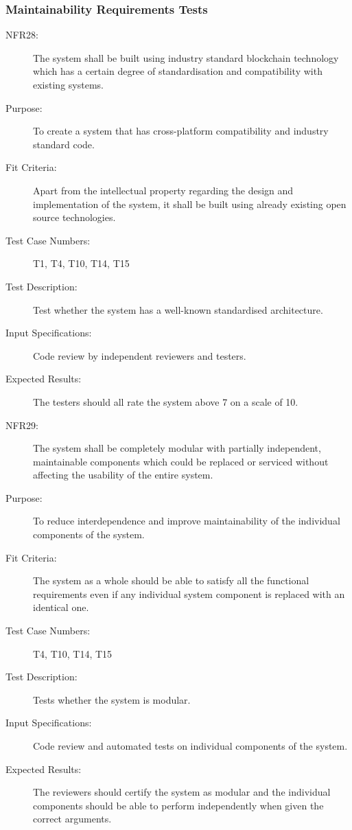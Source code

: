 \documentclass[a4paper,twoside,phd]{BYUPhys}
\begin{document}
\subsubsection{Maintainability Requirements Tests}
\begin{description}
\item[NFR28:] The system shall be built using industry standard blockchain technology which has a certain degree of standardisation and compatibility with existing systems.
\item[Purpose:] To create a system that has cross-platform compatibility and industry standard code.
\item[Fit Criteria:] Apart from the intellectual property regarding the design and implementation of the system, it shall be built using already existing open source technologies.
\item[Test Case Numbers:] T1, T4, T10, T14, T15
\item[Test Description:] Test whether the system has a well-known standardised architecture.
\item[Input Specifications:] Code review by independent reviewers and testers.
\item[Expected Results:] The testers should all rate the system above 7 on a scale of 10.

\item[NFR29:] The system shall be completely modular with partially independent, maintainable components which could be replaced or serviced without affecting the usability of the entire system.
\item[Purpose:] To reduce interdependence and improve maintainability of the individual components of the system.
\item[Fit Criteria:] The system as a whole should be able to satisfy all the functional requirements even if any individual system component is replaced with an identical one.
\item[Test Case Numbers:] T4, T10, T14, T15
\item[Test Description:] Tests whether the system is modular.
\item[Input Specifications:] Code review and automated tests on individual components of the system.
\item[Expected Results:] The reviewers should certify the system as modular and the individual components should be able to perform independently when given the correct arguments.


\end{description}
\end{document}
